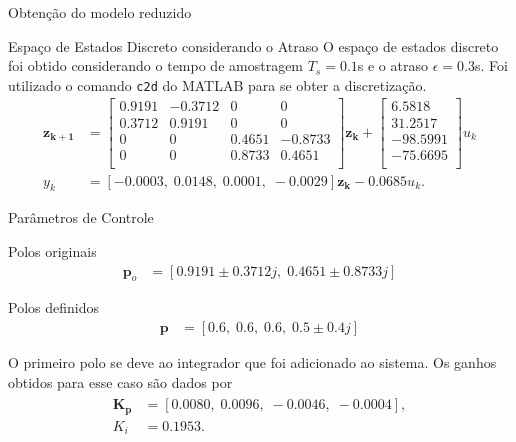 \documentclass[10pt]{beamer}
\newcommand\Fontvii{\fontsize{7}{8.2}\selectfont}
\begin{document}
\begin{frame}[fragile]{Obtenção do modelo reduzido}
\begin{block}{Espaço de Estados Discreto considerando o Atraso}
O espaço de estados discreto foi obtido considerando o tempo de amostragem $T_s = 0.1$s e o atraso $\epsilon = 0.3$s. Foi utilizado o comando \texttt{c2d} do MATLAB para se obter a discretização.
\Fontvii
\begin{align}
\mathbf{z_{k+1}} &= \left[\begin{array}{cccc}
	0.9191&   -0.3712&         0&         0\\
    0.3712&    0.9191&         0&         0\\
         0&         0&    0.4651&   -0.8733\\
         0&         0&    0.8733&    0.4651\\
 \end{array}\right]\mathbf{z_k} + \left[\begin{array}{c}
	6.5818\\
	   31.2517\\
	  -98.5991\\
	  -75.6695\\
	 \end{array}\right]u_k \\
y_k &= \left[-0.0003,\;0.0148,\;0.0001,\;-0.0029\right]\mathbf{z_k} - 0.0685 u_k.
\end{align}
\end{block}
\end{frame}

\begin{frame}[fragile]{Parâmetros de Controle}
\begin{block}{Polos originais}
\begin{align}
\mathbf{p}_o &= \left[0.9191\pm 0.3712j,\; 0.4651 \pm 0.8733j\right]	
\end{align}
	
\end{block}

\begin{block}{Polos definidos}
\begin{align}
\mathbf{p} &= \left[0.6,\;0.6,\;0.6,\;0.5\pm 0.4j\right]	
\end{align}	
\end{block}

O primeiro polo se deve ao integrador que foi adicionado ao sistema. Os ganhos obtidos para esse caso são dados por \begin{align}
 \begin{array}{ll}
	 	\mathbf{K_p} &= \left[0.0080,\;0.0096,\;-0.0046,\;-0.0004\right],\\
 	K_i &= 0.1953.\\ 	
 \end{array}\label{ganhosObtidos}
 \end{align}
	
\end{frame}
\end{document}
